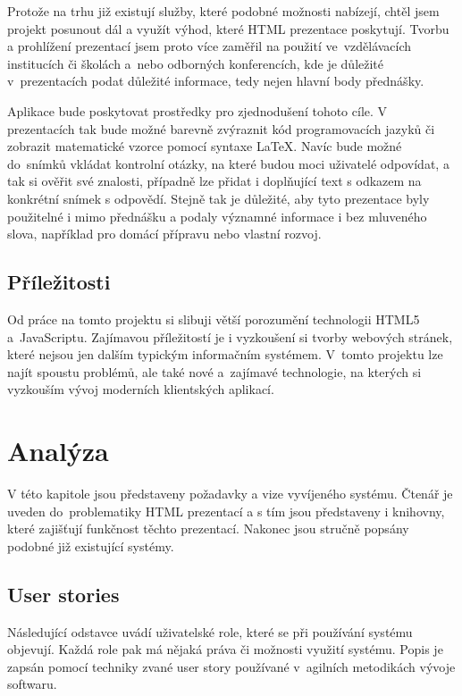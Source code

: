 \documentclass[11pt,twoside,a4paper]{book}
\newcommand*{\nom}[2]{#1\nomenclature{#1}{#2}} 			%
\begin{document}
Protože na trhu již existují služby, které podobné možnosti nabízejí, chtěl jsem projekt posunout dál a využít výhod, které HTML prezentace poskytují. Tvorbu a prohlížení prezentací jsem proto více zaměřil na použití ve~vzdělávacích institucích či školách a~nebo odborných konferencích, kde je důležité v~prezentacích podat důležité informace, tedy nejen hlavní body přednášky.

Aplikace bude poskytovat prostředky pro zjednodušení tohoto cíle. V prezentacích tak bude možné barevně zvýraznit kód programovacích jazyků či zobrazit matematické vzorce pomocí syntaxe \LaTeX. Navíc bude možné do~snímků vkládat kontrolní otázky, na které budou moci uživatelé odpovídat, a tak si ověřit své znalosti, případně lze přidat i doplňující text s odkazem na konkrétní snímek s odpovědí. Stejně tak je důležité, aby tyto prezentace byly použitelné i mimo přednášku a podaly významné informace i bez mluveného slova, například pro domácí přípravu nebo vlastní rozvoj. 

\section{Příležitosti}
Od práce na tomto projektu si slibuji větší porozumění technologii HTML5 a~Java\-Scriptu. Zajímavou příležitostí je i vyzkoušení si tvorby webových stránek, které nejsou jen dalším typickým informačním systémem. V~tomto projektu lze najít spoustu problémů, ale také nové a~zajímavé technologie, na kterých si vyzkouším vývoj moderních klientských aplikací.




\chapter{Analýza}
V této kapitole jsou představeny požadavky a vize vyvíjeného systému. Čtenář je uveden do~problematiky \nom{HTML}{HyperText Markup Language} prezentací a s tím jsou představeny i knihovny, které zajišťují funkčnost těchto prezentací. Nakonec jsou stručně popsány podobné již existující systémy.


\section{User stories}\label{chap:userstory}
Následující odstavce uvádí uživatelské role, které se při používání systému objevují. Každá role pak má nějaká práva či možnosti využití systému. Popis je zapsán pomocí techniky zvané user story používané v~agilních metodikách vývoje softwaru.
\end{document}
